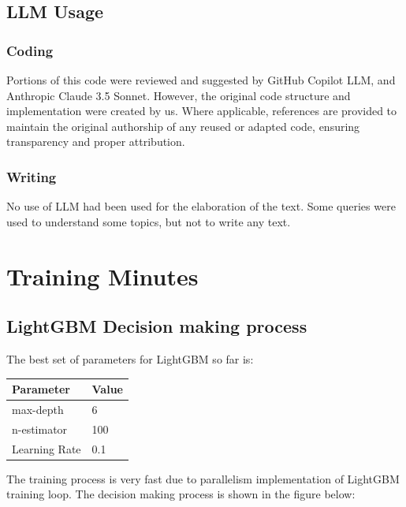 \documentclass[10pt,letterpaper]{article}
\begin{document}
\subsection{LLM Usage}

\subsubsection*{Coding}
Portions of this code were reviewed and suggested by GitHub Copilot LLM, and Anthropic Claude 3.5 Sonnet. However, the original code structure and implementation were created by us. Where applicable, references are provided to maintain the original authorship of any reused or adapted code, ensuring transparency and proper attribution.

\subsubsection*{Writing}
No use of LLM had been used for the elaboration of the text. Some queries were used to understand some topics, but not to write any text.

\section{Training Minutes}
\subsection{LightGBM Decision making process}
The best set of parameters for LightGBM so far is:
\begin{table}[H]
    \centering
    \begin{tabular}{ll}
    \textbf{Parameter} & \textbf{Value} \\
    \hline
    max-depth & 6 \\
    n-estimator & 100 \\
    Learning Rate & 0.1 \\
    \end{tabular}
    \end{table}
The training process is very fast due to parallelism implementation of LightGBM training loop. The decision making process is shown in the figure below:
\end{document}
